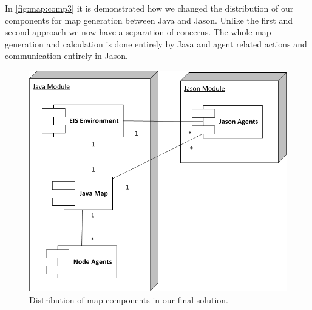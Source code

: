 In \autoref{fig:map:comp3} it is demonstrated how we changed the distribution of our components for map generation between Java and Jason. Unlike the first and second approach we now have a separation of concerns. The whole map generation and calculation is done entirely by Java and agent related actions and communication entirely in Jason.
\begin{figure}
  \centering
  \includegraphics[width=\linewidth]{images/map_comp_3.png}
  \caption{Distribution of map components in our final solution.}
  \label{fig:map:comp3}
\end{figure}

